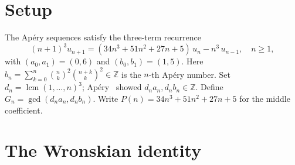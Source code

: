 \documentclass[11pt]{article}
\theoremstyle{definition}
\theoremstyle{remark}
\begin{document}
\begin{abstract}
coefficient zeros remains conjectural.
The Poisson tail predicts
$\max_{p \le N} Z(p) \sim 2\log\log N$,
so $Z(p)$ is almost certainly unbounded.
Under the weaker Ces\`aro hypothesis
$\sum_{p \le x} Z(p) \ll \pi(x)$
(Hypothesis~$\bar{Z}$),
which the Poisson model supports, we prove
$\log G_n = O(\sqrt{n})$
for density~$1$, matching the unconditional
small-prime floor, with the conditional
exceptional set shrinking to $O(N^{1/3})$
and having upper Banach density zero.
The proof combines a dyadic
divisor-incidence bound with a sub-interval
zero-count argument to reduce the
leading-digit bottleneck from
$O(N^{3/2})$ to $O(N^{10/7}/\log N)$
unconditionally, and to $O(N^{4/3}/\log N)$
under Hypothesis~$\bar{Z}$.
A prime-wise decomposition of the
residual $L^2$-norm
$\|\eta\|^2 = D + O$ (diagonal~$+$~off-diagonal)
shows that
$D = T + O(1/\ln N)$ unconditionally,
reducing the all-$n$ conjecture $G_n = e^{o(n)}$
to a two-prime dispersion input:
the cross-prime interaction~$O$ is~$o(T)$.
Computation through $N = 262{,}144$ confirms
$|O/T| < 2 \times 10^{-3}$.
Two structural reductions further localize the gap:
prime counting alone disposes of every prime
$p \le n/(f(n)\log n)$ for any $f \to \infty$,
so only the quotient classes
$\lfloor n/p \rfloor < f(n)\log n$ matter;
and a single fixed factorial moment
$(\mathrm{HM})_k$ with $k > 6$---at the independence
scale, compatible with $Z(p) \ll p^{2/3}$, and proved
here unconditionally for $k = 2$---would give the
full conjecture with the power saving
$\log G_n \ll n^{2/3 + 2/k + o(1)}$.
\end{abstract}

\section{Setup}

The Ap\'ery sequences satisfy the three-term recurrence
\begin{equation}\label{eq:rec}
(n+1)^3 u_{n+1} = (34n^3 + 51n^2 + 27n + 5)\,u_n - n^3\,u_{n-1},
\quad n \ge 1,
\end{equation}
with $(a_0, a_1) = (0, 6)$ and $(b_0, b_1) = (1, 5)$.
Here $b_n = \sum_{k=0}^n \binom{n}{k}^2 \binom{n+k}{k}^2 \in \mathbb{Z}$
is the $n$-th Ap\'ery number.
Set $d_n = \operatorname{lcm}(1,\ldots,n)^3$;
Ap\'ery~\cite{Apery1979} showed $d_n a_n, d_n b_n \in \mathbb{Z}$.
Define $G_n = \gcd(d_n a_n, d_n b_n)$.
Write $P(n) = 34n^3 + 51n^2 + 27n + 5$ for the middle coefficient.

\section{The Wronskian identity}
\end{document}
